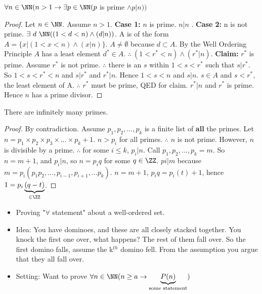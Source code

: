 \begin{theorem}
$\forall n \in \NN ( n > 1 \to \exists p \in \NN ( p$ is prime $\wedge p|n)) $
\end{theorem}
\begin{proof}
Let $n\in\NN$. Assume $n>1$. \textbf{Case 1:} $n$ is prime. $n|n$ \checkmark. \textbf{Case 2:} n is not prime. $\exists\ d\ \NN ((1<d<n) \wedge (d|n))$. A is of the form $A = \{ x | (1 < x < n) \wedge (x|n) \}$. $A \neq \emptyset$ because $d \subset A$. By the Well Ordering Principle $A$ has a least element $d^*\in A$. $\therefore\ (1 < r^* < n) \wedge (r^*|n)$. \textbf{Claim:} $r^*$ is prime. Assume $r^*$ is not prime. $\therefore$ there is an $s$ within $1<s<r^*$ such that $s|r^*$. So $1<s<r^*<n$ and $s|r^*$ and $r^*|n$. Hence $1<s<n$ and $s|n$. $s\in A$ and $s<r^*$, the least element of A. $\therefore$ $r^*$ must be prime, QED for claim. $r^*|n$ and $r^*$ is prime. Hence $n$ has a prime divisor.
\end{proof}
\begin{theorem}There are infinitely many primes.\end{theorem}
\begin{proof}
By contradiction. Assume $p_1,p_2,...,p_k$ is a finite list of \textbf{all} the primes. Let $n=p_1\times p_2 \times p_3 \times ... \times p_k + 1$. $n>p_i$ for all primes. $\therefore$ $n$ is not prime. However, $n$ is divisible by a prime. $\therefore$ for some $i \le k$, $p_i|n$. Call $p_1,p_2,...,p_k = m$. So $n = m + 1$, and $p_i|n$, so $n=p_iq$ for some $q\in \ZZ$. $pi|m$ because $m = p_i(p_1p_2,...,p_{i-1},p_{i+1},...p_k)$. $n = m + 1$, $p_iq = p_i(t) + 1$, hence $ 1 = p_i \underbrace{\left(q-t\right)}_{\in \ZZ} $. %
\end{proof}
\begin{itemize}
\item Proving "$\forall$ statement" about a well-ordered set.
\item Idea: You have dominoes, and these are all closely stacked together. You knock the first one over, what happens? The rest of them fall over. So the first domino falls, assume the k$^{th}$ domino fell. From the assumption you argue that they all fall over.
\item Setting: Want to prove $\forall n \in \NN ( n \ge a \to \underbrace{P(n)}_{\text{some statement}})$
\end{itemize}
